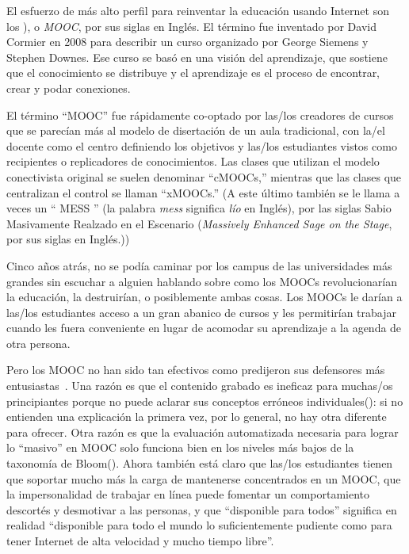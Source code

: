 
El esfuerzo de más alto perfil para reinventar la educación usando Internet
son los ), o \emph{MOOC}, por sus siglas en Inglés.
El término fue inventado por David Cormier en 2008
para describir un curso organizado por George Siemens
y Stephen Downes.
Ese curso se basó en una visión  del aprendizaje,
que sostiene que el conocimiento se distribuye
y el aprendizaje es el proceso de encontrar, crear y podar conexiones.

El término ``MOOC'' fue rápidamente co-optado por las/los creadores de
cursos que se parecían más al modelo de disertación de un aula tradicional,
con la/el docente como el centro definiendo los objetivos
y las/los estudiantes vistos como recipientes o replicadores de conocimientos.
Las clases que utilizan el modelo conectivista original se suelen denominar ``cMOOCs,''
mientras que las clases que centralizan el control se llaman ``xMOOCs.''
(A este último también se le llama a veces un `` MESS '' (la palabra \emph{mess} significa \emph{lío} en Inglés),
por las siglas Sabio Masivamente Realzado en el Escenario (\emph{Massively Enhanced Sage on the Stage}, por sus siglas en Inglés.))

Cinco años atrás,
no se podía caminar por los campus de las universidades más grandes
sin escuchar a alguien hablando sobre como los MOOCs revolucionarían la educación,
la destruirían,
o posiblemente ambas cosas.
Los MOOCs le darían a las/los estudiantes acceso a un gran abanico de cursos
y les permitirían trabajar cuando les fuera conveniente
en lugar de acomodar su aprendizaje a la agenda de otra persona.

Pero los MOOC no han sido tan efectivos
como predijeron sus defensores más entusiastas~\cite{Ubel2017}.
Una razón es que
el contenido grabado es ineficaz para muchas/os principiantes
porque no puede aclarar sus conceptos erróneos individuales():
si no entienden una explicación la primera vez,
por lo general, no hay otra diferente para ofrecer.
Otra razón es que la evaluación automatizada necesaria para lograr lo ``masivo'' en MOOC
solo funciona bien en los niveles más bajos de la taxonomía de Bloom().
Ahora también está claro que
las/los estudiantes tienen que soportar mucho más la carga de mantenerse concentrados en un MOOC,
que la impersonalidad de trabajar en línea puede fomentar un comportamiento descortés y desmotivar a las personas,
y que ``disponible para todos'' significa en realidad
``disponible para todo el mundo lo suficientemente pudiente como para tener Internet de alta velocidad y mucho tiempo libre''.

